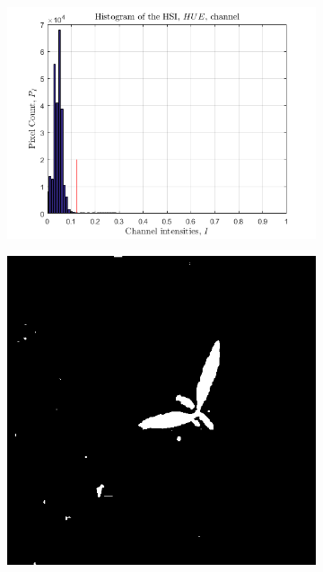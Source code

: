 \begin{figure}[]
\begin{subfigure}[b]{0.3\textwidth}
		\caption{}
		\label{fig:seg_d}
    \end{subfigure}
    \begin{subfigure}[b]{0.3\textwidth}
        \centering
        \includegraphics[width=\textwidth]{./figure/result/segmentation/imgCLIPPING.png}
		\caption{}
		\label{fig:seg_e}
    \end{subfigure}
    \begin{subfigure}[b]{0.3\textwidth}
        \centering
        \includegraphics[width=\textwidth]{./figure/result/segmentation/imgHSIThreshold.png}

\end{subfigure}
\end{figure}
